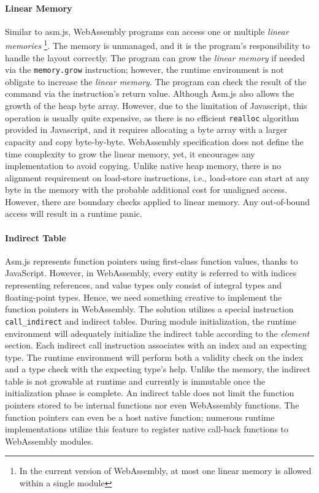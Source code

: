 \paragraph{Linear Memory}
Similar to asm.js, WebAssembly programs can access one or multiple \emph{linear
memories} \footnote{In the current version of WebAssembly, at most one linear
memory is allowed within a single module}. The memory is unmanaged, and it is
the program's responsibility to handle the layout correctly. The program can
grow the \emph{linear memory} if needed via the \texttt{memory.grow}
instruction; however, the runtime environment is not obligate to increase the
\emph{linear memory}. The program can check the result of the command via the
instruction's return value. Although Asm.js also allows the growth of the heap
byte array. However, due to the limitation of Javascript, this operation is
usually quite expensive, as there is no efficient \texttt{realloc} algorithm
provided in Javascript, and it requires allocating a byte array with a larger
capacity and copy byte-by-byte. WebAssembly specification does not define the
time complexity to grow the linear memory, yet, it encourages any implementation
to avoid copying.  Unlike native heap memory, there is no alignment requirement
on load-store instructions, i.e., load-store can start at any byte in the memory
with the probable additional cost for unaligned access. However, there are
boundary checks applied to linear memory. Any out-of-bound access will result in
a runtime panic.

\paragraph{Indirect Table}
Asm.js represents function pointers using first-class function values, thanks to
JavaScript. However, in WebAssembly, every entity is referred to with indices
representing references, and value types only consist of integral types and
floating-point types. Hence, we need something creative to implement the
function pointers in WebAssembly. The solution utilizes a special instruction
\texttt{call\_indirect} and indirect tables. During module initialization,
the runtime environment will adequately initialize the indirect table according
to the \emph{element} section. Each indirect call instruction associates with an
index and an expecting type. The runtime environment will perform both a
validity check on the index and a type check with the expecting type's help.
Unlike the memory, the indirect table is not growable at runtime and currently
is immutable once the initialization phase is complete. An indirect table does
not limit the function pointers stored to be internal functions nor even
WebAssembly functions. The function pointers can even be a host native function;
numerous runtime implementations utilize this feature to register native
call-back functions to WebAssembly modules.

